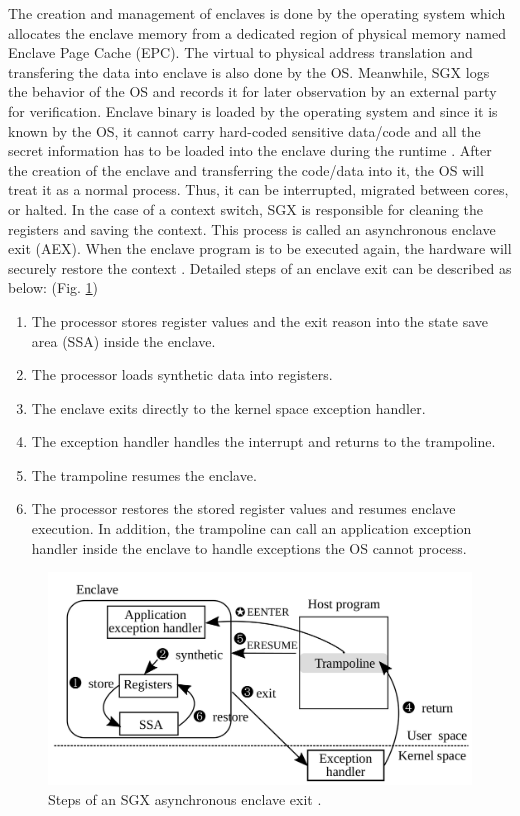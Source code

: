 The creation and management of enclaves is done by the operating system which allocates the enclave memory from a dedicated region of physical memory named Enclave Page Cache (EPC). The virtual to physical address translation and transfering the data into enclave is also done by the OS. Meanwhile, SGX logs the behavior of the OS and records it for later observation by an external party for verification. Enclave binary is loaded by the operating system and since it is known by the OS, it cannot carry hard-coded sensitive data/code and all the secret information has to be loaded into the enclave during the runtime \cite{mge}. After the creation of the enclave and transferring the code/data into it, the OS will treat it as a normal process. Thus, it can be interrupted, migrated between cores, or halted. In the case of a context switch, SGX is responsible for cleaning the registers and saving the context. This process is called an asynchronous enclave exit (AEX). When the enclave program is to be executed again, the hardware will securely restore the context \cite{brasser2017software}. Detailed steps of an enclave exit can be described as below: \cite{tsgx} (Fig. \ref{fig:aex})

\begin{enumerate}
	\item The processor stores register values and the exit reason into the state save area (SSA) inside the enclave.
	\item The processor loads synthetic data into registers.
	\item The enclave exits directly to the kernel space exception handler.
	\item The exception handler handles the interrupt and returns to the trampoline.
	\item The trampoline resumes the enclave.
	\item The processor restores the stored register values and resumes enclave execution. In addition, the trampoline can call an application exception handler inside the enclave to handle exceptions the OS cannot process.
\end{enumerate}

\begin{figure}
	\includegraphics[scale=0.2]{images/tsgx}
	\caption{Steps of an SGX asynchronous enclave exit \cite{tsgx}.}
	\label{fig:aex}
\end{figure}

